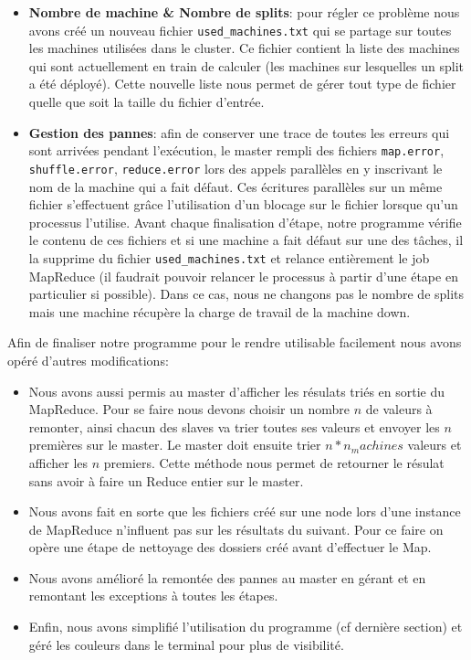 \documentclass{article}
\begin{document}
\begin{itemize}
    \item \textbf{Nombre de machine \& Nombre de splits}: pour régler ce problème nous avons créé un nouveau fichier \texttt{used\_machines.txt} qui se partage sur toutes les machines utilisées dans le cluster. 
    Ce fichier contient la liste des machines qui sont actuellement en train de calculer (les machines sur lesquelles un split a été déployé). Cette nouvelle liste nous permet de gérer tout type de fichier quelle que soit la taille du fichier d'entrée.
    \item \textbf{Gestion des pannes}: afin de conserver une trace de toutes les erreurs qui sont arrivées pendant l'exécution, le master rempli des fichiers \texttt{map.error}, \texttt{shuffle.error}, \texttt{reduce.error} lors des appels parallèles en y inscrivant le nom de la machine qui a fait défaut. 
    Ces écritures parallèles sur un même fichier s'effectuent grâce l'utilisation d'un blocage sur le fichier lorsque qu'un processus l'utilise. Avant chaque finalisation d'étape, notre programme vérifie le contenu de ces fichiers et si une machine a fait défaut sur une des tâches, il la supprime du fichier
    \texttt{used\_machines.txt} et relance entièrement le job MapReduce (il faudrait pouvoir relancer le processus à partir d'une étape en particulier si possible). Dans ce cas, nous ne changons pas le nombre de splits mais une machine récupère la charge de travail de la machine down.
\end{itemize}

Afin de finaliser notre programme pour le rendre utilisable facilement nous avons opéré d'autres modifications:
\begin{itemize}
    \item Nous avons aussi permis au master d'afficher les résulats triés en sortie du MapReduce. Pour se faire nous devons choisir un nombre $n$ de valeurs à remonter, ainsi chacun des slaves va trier toutes ses valeurs et envoyer les $n$ premières sur le master.
    Le master doit ensuite trier $n * n_machines$ valeurs et afficher les $n$ premiers. Cette méthode nous permet de retourner le résulat sans avoir à faire un Reduce entier sur le master.
    \item Nous avons fait en sorte que les fichiers créé sur une node lors d'une instance de MapReduce n'influent pas sur les résultats du suivant. Pour ce faire on opère une étape de nettoyage des dossiers créé avant d'effectuer le Map.
    \item Nous avons amélioré la remontée des pannes au master en gérant et en remontant les exceptions à toutes les étapes.
    \item  Enfin, nous avons simplifié l'utilisation du programme (cf dernière section) et géré les couleurs dans le terminal pour plus de visibilité.
\end{itemize}
\end{document}
